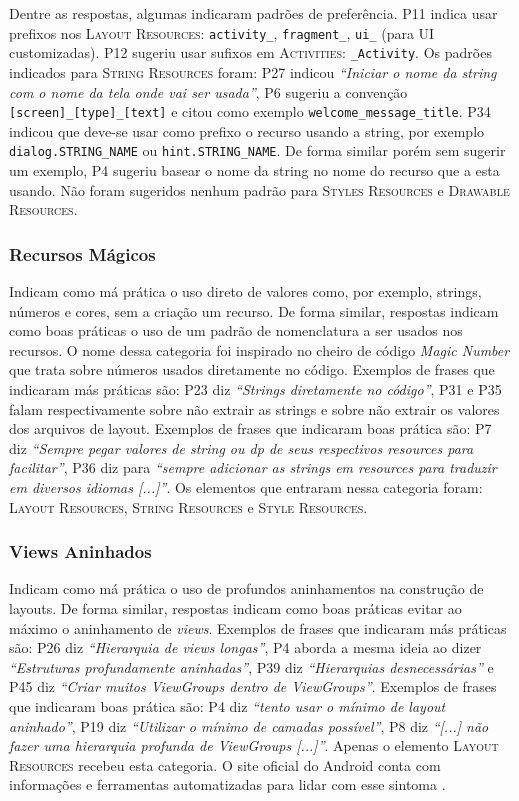 Dentre as respostas, algumas indicaram padrões de preferência. P11 indica usar prefixos nos \textsc{Layout Resources}: \texttt{activity\_}, \texttt{fragment\_}, \texttt{ui\_} (para UI customizadas). P12 sugeriu usar sufixos em \textsc{Activities}: \texttt{\_Activity}. Os padrões indicados para \textsc{String Resources} foram: P27 indicou \textit{``Iniciar o nome da string com o nome da tela onde vai ser usada''}, P6 sugeriu a convenção \texttt{[screen]\_[type]\_[text]} e citou como exemplo \texttt{welcome\_message\_title}. P34 indicou que deve-se usar como prefixo o recurso usando a string, por exemplo \texttt{dialog.STRING\_NAME} ou \texttt{hint.STRING\_NAME}. De forma similar porém sem sugerir um exemplo, P4 sugeriu basear o nome da string no nome do recurso que a esta usando. Não foram sugeridos nenhum padrão para \textsc{Styles Resources} e \textsc{Drawable Resources}.

\subsubsection{Recursos Mágicos}
Indicam como má prática o uso direto de valores como, por exemplo, strings, números e cores, sem a criação um recurso. De forma similar, respostas indicam como boas práticas o uso de um padrão de nomenclatura a ser usados nos recursos. O nome dessa categoria foi inspirado no cheiro de código \textit{Magic Number} \cite{Martin:2008:CCH:1388398} que trata sobre números usados diretamente no código. Exemplos de frases que indicaram más práticas são: P23 diz \textit{``Strings diretamente no código''}, P31 e P35 falam respectivamente sobre não extrair as strings e sobre não extrair os valores dos arquivos de layout. Exemplos de frases que indicaram boas prática são: P7 diz \textit{``Sempre pegar valores de string ou dp de seus respectivos resources para facilitar''}, P36 diz para \textit{``sempre adicionar as strings em resources para traduzir em diversos idiomas [...]''}. Os elementos que entraram nessa categoria foram: \textsc{Layout Resources}, \textsc{String Resources} e \textsc{Style Resources}. 


\subsubsection{Views Aninhados} 
Indicam como má prática o uso de profundos aninhamentos na construção de layouts. De forma similar, respostas indicam como boas práticas evitar ao máximo o aninhamento de \textit{views}. Exemplos de frases que indicaram más práticas são: P26 diz \textit{``Hierarquia de views longas''}, P4 aborda a mesma ideia ao dizer \textit{``Estruturas profundamente aninhadas''}, P39 diz \textit{``Hierarquias desnecessárias''} e P45 diz \textit{``Criar muitos ViewGroups dentro de ViewGroups''}. Exemplos de frases que indicaram boas prática são: P4 diz \textit{``tento usar o mínimo de layout aninhado''}, P19 diz \textit{``Utilizar o mínimo de camadas possível''}, P8 diz \textit{``[...] não fazer uma hierarquia profunda de ViewGroups [...]''}. Apenas o elemento \textsc{Layout Resources} recebeu esta categoria. O site oficial do Android conta com informações e ferramentas automatizadas para lidar com esse sintoma \cite{OptmizingViewHierarchies}. 


